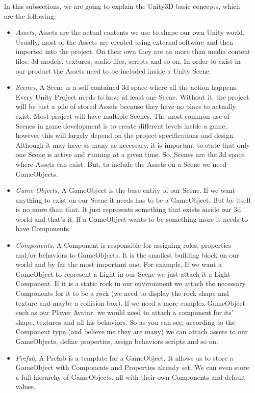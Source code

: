 In this subsections, we are going to explain the Unity3D basic concepts, which are the following:

\begin{itemize}
\item \textit{Assets}, Assets are the actual contents we use to shape our own Unity world. Usually, most of the Assets are created using external software and then imported into the project.
On their own they are no more than media content files: 3d models, textures, audio files, scripts and so on. 
In order to exist in our product the Assets need to be included inside a Unity Scene.
\item \textit{Scenes}, A Scene is a self-contained 3d space where all the action happens. Every Unity Project needs to have at least one Scene. Without it, the project will be just a pile of stored Assets because they have no place to actually exist.
Most project will have multiple Scenes. The most common use of Scenes in game development is to create different levels inside a game, however this will largely depend on the project specifications and design. Although it may have as many as necessary, it is important to state that only one Scene is active and running at a given time.
So, Scenes are the 3d space where Assets can exist. But, to include the Assets on a Scene we need GameObjects.
\item \textit{Game Objects}, A GameObject is the base entity of our Scene. If we want anything to exist on our Scene it needs has to be a GameObject. But by itself is no more than that. It just represents something that exists inside our 3d world and that’s it.
If a GameObject wants to be something more it needs to have Components.
\item \textit{Components}, A Component is responsible for assigning roles, properties and/or behaviors to GameObjects. It is the smallest building block on our world and by far the most important one.
For example, If we want a GameObject to represent a Light in our Scene we just attach it a Light Component. If it is a static rock in our environment we attach the necessary Components for it to be a rock (we need to display the rock shape and texture and maybe a collision box). If we need a more complex GameObject such as our Player Avatar, we would need to attach a component for its’ shape, textures and all his behaviors.
So as you can see, according to the Component type (and believe me they are many) we can attach assets to our GameObjects, define properties, assign behaviors scripts and so on.
\item \textit{Prefab}, A Prefab is a template for a GameObject. It allows us to store a GameObject with Components and Properties already set. We can even store a full hierarchy of GameObjects, all with their own Components and default values. 
\end{itemize}

